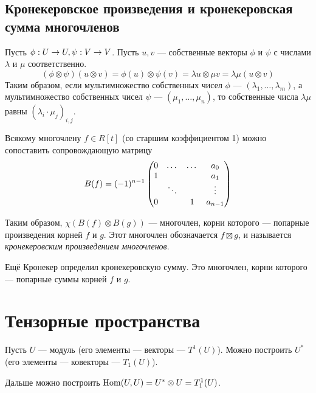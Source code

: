 \subsection{Кронекеровское произведения и кронекеровская сумма многочленов}
Пусть $\phi: U \rightarrow U, \psi: V \rightarrow V$.
Пусть $u, v$ --- собственные векторы $\phi$ и $\psi$ с числами $\lambda$ и $\mu$ соответственно.
\[(\phi \otimes \psi)(u \otimes v) = \phi(u) \otimes \psi(v) = \lambda u \otimes \mu v = \lambda \mu(u \otimes v)\]
Таким образом, если мультимножество собственных чисел $\phi$ --- $(\lambda_1, \dots, \lambda_m)$, а мультимножество собственных чисел $\psi$ --- $(\mu_1, \dots, \mu_n)$, то собственные числа $\lambda\mu$ равны $(\lambda_i\cdot \mu_j)_{i,j}$.

Всякому многочлену $f \in R[t]$ (со старшим коэффициентом 1) можно сопоставить сопровождающую матрицу
\[B(f) = (-1)^{n-1}\begin{pmatrix}0 & \dots & \dots & a_0 \\ 1 & & & a_1 \\ & \ddots & &\vdots\\ 0 & & 1 & a_{n-1}\end{pmatrix}\]

Таким образом, $\chi(B(f) \otimes B(g))$ --- многочлен, корни которого --- попарные произведения корней $f$ и $g$.
Этот многочлен обозначается $f \boxtimes g$, и называется \textit{кронекеровским произведением многочленов}.

Ещё Кронекер определил кронекеровскую сумму.
Это многочлен, корни которого --- попарные суммы корней $f$ и $g$.


\section{Тензорные пространства}
Пусть $U$ --- модуль (его элементы --- векторы --- $T^1(U)$).
Можно построить $U^*$ (его элементы --- ковекторы --- $T_1(U)$).

Дальше можно построить $\operatorname{Hom}(U, U) = U^* \otimes U = T^1_1(U)$.

